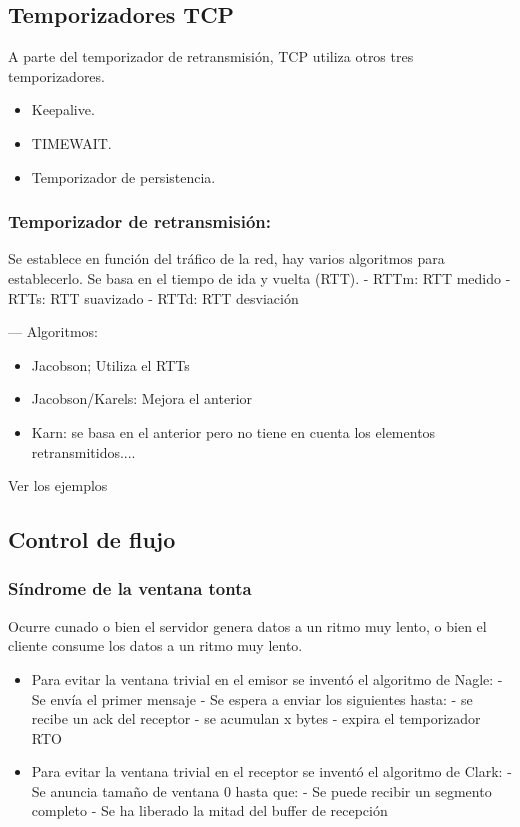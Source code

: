 \subsection{Temporizadores TCP}
A parte del temporizador de retransmisión, TCP utiliza otros tres temporizadores.
\begin{itemize}
    \item Keepalive.
    \item TIMEWAIT.
    \item Temporizador de persistencia.
\end{itemize}
\subsubsection{Temporizador de retransmisión:}
Se establece en función del tráfico de la red, hay varios algoritmos para establecerlo.
Se basa en el tiempo de ida y vuelta (RTT).
- RTTm: RTT medido
- RTTs: RTT suavizado
- RTTd: RTT desviación


---
Algoritmos:
\begin{itemize}
    \item Jacobson; Utiliza el RTTs
    \item Jacobson/Karels: Mejora el anterior
    \item Karn: se basa en el anterior pero no tiene en cuenta los elementos retransmitidos....
\end{itemize}
Ver los ejemplos

\subsection{Control de flujo}
\subsubsection{Síndrome de la ventana tonta}
Ocurre cunado o bien el servidor genera datos a un ritmo muy lento, o bien el cliente consume los datos a un ritmo muy lento.
\begin{itemize}
    \item Para evitar la ventana trivial en el emisor se inventó el algoritmo de Nagle:
    - Se envía el primer mensaje
    - Se espera a enviar los siguientes hasta:
            - se recibe un ack del receptor
            - se acumulan x bytes
            - expira el temporizador RTO
    \item Para evitar la ventana trivial en el receptor se inventó el algoritmo de Clark:
    - Se anuncia tamaño de ventana 0 hasta que:
            - Se puede recibir un segmento completo
            - Se ha liberado la mitad del buffer de recepción
\end{itemize}
